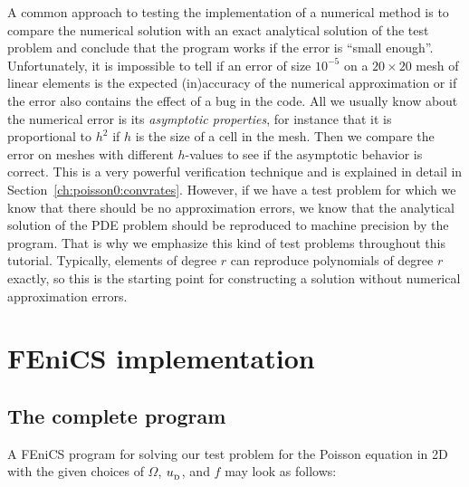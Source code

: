 \documentclass[graybox,envcountchap,sectrefs,final]{svmonodo}
\newenvironment{notice_mdfboxadmon}[1][]{
\begin{notice_mdfboxmdframed}[frametitle=#1]
}
{
\end{notice_mdfboxmdframed}
}
\begin{document}

\begin{notice_mdfboxadmon}
A common approach to testing the implementation of a numerical method
is to compare the numerical
solution with an exact analytical solution of the test problem and
conclude that the program works if the error is ``small enough''.
Unfortunately, it is impossible to tell if an error of size $10^{-5}$ on a
$20\times 20$ mesh of linear elements is the expected (in)accuracy of the
numerical approximation or if the error also contains the effect of a
bug in the code. All we usually know about the numerical error is its
\emph{asymptotic properties}, for instance that it is proportional to $h^2$
if $h$ is the size of a cell in the mesh. Then we compare the
error on meshes with different $h$-values to see if the asymptotic
behavior is correct. This is a very powerful verification
technique and is explained in detail in Section~\ref{ch:poisson0:convrates}.
However, if we have a test problem for which
we know that there should be no approximation errors, we know that
the analytical solution of the PDE problem should be reproduced to
machine precision by the program. That is why we emphasize this kind
of test problems throughout this tutorial. Typically, elements of
degree $r$ can reproduce polynomials of degree $r$ exactly, so this
is the starting point for constructing a solution without numerical
approximation errors.
\end{notice_mdfboxadmon} %

\section{FEniCS implementation}
\label{ch:poisson0:impl}

\subsection{The complete program}

A FEniCS program for solving our test problem for the Poisson equation
in 2D with the given choices of $\Omega$, $\ub$, and $f$ may look as
follows:
\end{document}
